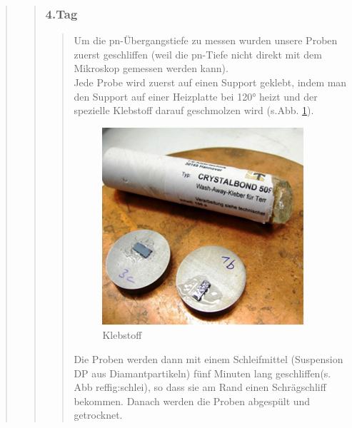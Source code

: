 \begin{quote}
\begin{quote}
\begin{quote}
    		\vspace{2em}
    		
			\end{quote}
    	
    	\subsubsection{4.Tag}
    	\begin{quote}
    	
    		Um die pn-Übergangstiefe zu messen wurden unsere Proben zuerst 
    		geschliffen (weil die pn-Tiefe nicht direkt mit dem Mikroskop 
    		gemessen werden kann).\\
			Jede Probe wird zuerst auf einen Support geklebt, indem man den 
			Support auf einer Heizplatte bei 120° heizt und der spezielle 
			Klebstoff darauf geschmolzen wird (s.Abb. \ref{fig:kleb}).
    	
    		\vspace{2em}
    		
    		\begin{figure}[H]
				\hspace{3 cm}
                  \includegraphics[scale=1, trim = 0cm 0cm 0cm 0cm,clip]
                	{./HerstellungBilder/KlebstoffunddieProben.png}
                  \caption{Klebstoff}
                \label{fig:kleb}
            \end{figure}
            
    		\vspace{2em}
    		
    		Die Proben werden dann mit einem Schleifmittel (Suspension DP aus 
    		Diamantpartikeln) fünf Minuten lang geschliffen(s. 
    		Abb ref{fig:schlei}), so dass sie am Rand einen Schrägschliff 
    		bekommen. Danach werden die Proben abgespült und getrocknet.
    	

\end{quote}
\end{quote}
\end{quote}
